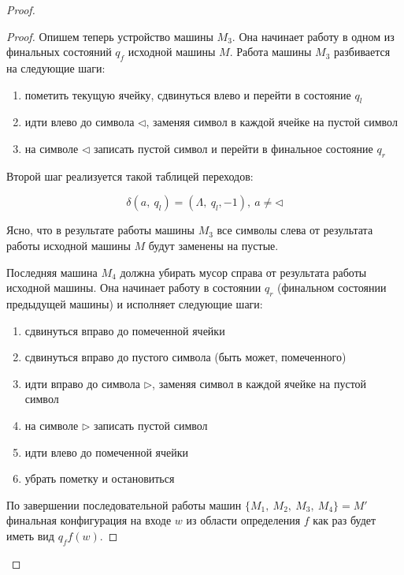 \documentclass[a4paper, 12pt]{article}
\begin{document}
\begin{proof}
\begin{proof}
        Опишем теперь устройство машины $M_3$. Она начинает работу в одном из финальных состояний $q_f$ исходной машины $M$. Работа машины $M_3$ разбивается на следующие шаги:
        
        \begin{enumerate}
            \item пометить текущую ячейку, сдвинуться влево и перейти в состояние $q_l$
            \item идти влево до символа $\triangleleft$, заменяя символ в каждой ячейке на пустой символ
            \item на символе $\triangleleft$ записать пустой символ и перейти в финальное состояние $q_r$
        \end{enumerate}

        Второй шаг реализуется такой таблицей переходов:
        
        \[
           \delta(a,\ q_l) = (\Lambda,\ q_l, -1),\ a \neq \triangleleft
        \]
        
        Ясно, что в результате работы машины $M_3$ все символы слева от результата работы исходной машины $M$ будут заменены на пустые.
        
        Последняя машина $M_4$ должна убирать мусор справа от результата работы исходной машины. Она начинает работу в состоянии $q_r$ (финальном состоянии предыдущей машины) и исполняет следующие шаги:
        
        \begin{enumerate}
            \item сдвинуться вправо до помеченной ячейки
            \item сдвинуться вправо до пустого символа (быть может, помеченного)
            \item идти вправо до символа $\triangleright$, заменяя символ в каждой ячейке на пустой символ
            \item на символе $\triangleright$ записать пустой символ
            \item идти влево до помеченной ячейки
            \item убрать пометку и остановиться
        \end{enumerate}

        По завершении последовательной работы машин $\{M_1,\ M_2,\ M_3,\ M_4\} = M'$ финальная конфигурация на входе $w$ из области определения $f$ как раз будет иметь вид $q_f f(w)$.
        
    \end{proof}
    

\end{proof}
\end{document}
